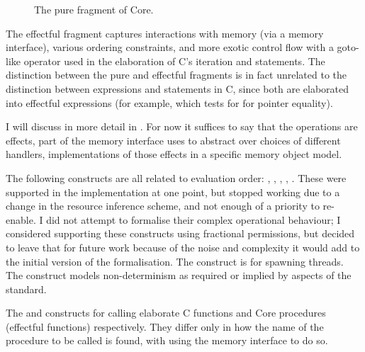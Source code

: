 \begin{figure*}[tp]
    \ContinuedFloat*
    \raggedright%
    \small%
    \cngrammarcompressed{\textwidth}{%
        \cnpce{}\cninterrule{}
        \cnname{}\cninterrule{}
        \cncpat{}\cninterrule{}
        \cnctor{}\cnafterlastrule{}
    }
    \caption{The pure fragment of Core.}\label{fig:pure-core-grammar}
\end{figure*}

The effectful fragment captures interactions with memory (via a memory
interface), various ordering constraints, and more exotic control flow with a
goto-like operator used in the elaboration of C's iteration and 
statements. The distinction between the pure and effectful fragments is in
fact unrelated to the distinction between expressions and statements in C,
since both are elaborated into effectful expressions (for example,
 which tests for for pointer equality).

I will discuss  in more detail in %
. For now it suffices to say that the
operations are effects, part of the memory interface  uses to abstract
over choices of different handlers, implementations of those effects in a
specific memory object model.

The following constructs are all related to evaluation order:
, , , %
, . These were supported %
in the implementation at one point, but
stopped working due to a change in the resource inference scheme, and not
enough of a priority to re-enable. I did not attempt to formalise their complex
operational behaviour; I considered supporting these constructs using
fractional permissions, but decided to leave that for future work because of
the noise and complexity it would add to the initial version of the
formalisation. The  construct is for spawning %
threads. The  construct models non-determinism %
as required or implied by aspects of the standard.

The  and  constructs for %
calling elaborate C functions and Core procedures (effectful functions)
respectively. They differ only in how the name of the procedure to be called is
found, with  using the memory interface to do so. %

